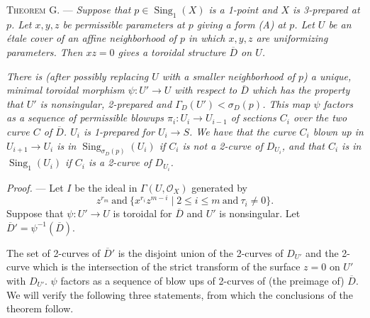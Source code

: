 \documentclass[11pt]{article}
\newcommand{\OO}{\mathcal{O}}                  %
\newcommand{\Dbar}{\overline{D}}               %
\newcommand{\Sing}{\operatorname{Sing}}
\begin{document}

\medskip
\textsc{Theorem G.} --- \emph{Suppose that $p \in \Sing_1(X)$ is a 1-point and $X$ is
3-prepared at $p$. Let $x, y, z$ be permissible parameters at $p$ giving a form (A) at
$p$. Let $U$ be an \'etale cover of an affine neighborhood of $p$ in which $x, y, z$ are
uniformizing parameters. Then $xz = 0$ gives a toroidal structure $\Dbar$ on $U$.}

\emph{There is (after possibly replacing $U$ with a smaller neighborhood of $p$) a
unique, minimal toroidal morphism $\psi : U' \to U$ with respect to $\Dbar$ which has the
property that $U'$ is nonsingular, 2-prepared and $\Gamma_D(U') < \sigma_D(p)$. This map
$\psi$ factors as a sequence of permissible blowups $\pi_i : U_i \to U_{i-1}$ of sections
$C_i$ over the two curve $C$ of $\Dbar$. $U_i$ is 1-prepared for $U_i \to S$. We have
that the curve $C_i$ blown up in $U_{i+1} \to U_i$ is in $\Sing_{\sigma_D(p)}(U_i)$ if
$C_i$ is not a 2-curve of $D_{U_i}$, and that $C_i$ is in $\Sing_1(U_i)$ if $C_i$ is a
2-curve of $D_{U_i}$.}

\medskip
\emph{Proof.} --- Let $I$ be the ideal in $\Gamma(U, \OO_X)$ generated by
\[
z^{r_m} \ \text{and}\ \{ x^{r_i} z^{m-i} \mid 2 \leqslant i \leqslant m \ \text{and}\ \tau_i \neq 0 \}.
\]
Suppose that $\psi : U' \to U$ is toroidal for $\Dbar$ and $U'$ is nonsingular. Let
$\Dbar' = \psi^{-1}(\Dbar)$.


The set of 2-curves of $\Dbar'$ is the disjoint union of the 2-curves of $D_{U'}$ and the
2-curve which is the intersection of the strict transform of the surface $z = 0$ on $U'$
with $D_{U'}$. $\psi$ factors as a sequence of blow ups of 2-curves of (the preimage of)
$\Dbar$. We will verify the following three statements, from which the conclusions of the
theorem follow.
\end{document}
